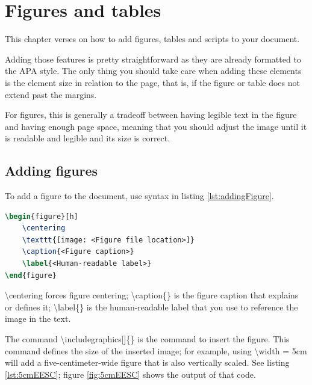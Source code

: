 \chapter{Figures and tables}

	This chapter verses on how to add figures, tables and scripts to your document.

	Adding those features is pretty straightforward as they are already formatted to the APA style. The only thing you should take care when adding these elements is the element size in relation to the page, that is, if the figure or table does not extend past the margins.

	For figures, this is generally a tradeoff between having legible text in the figure and having enough page space, meaning that you should adjust the image until it is readable and legible and its size is correct.

	\section{Adding figures}

	To add a figure to the document, use syntax in listing \ref{lst:addingFigure}.

\begin{lstlisting}[caption = {Basic code for adding a figure.}, label = {lst:addingFigure}, style = prettyListing, language = tex]
\begin{figure}[h]
	\centering
	\texttt{[image: <Figure file location>]}
	\caption{<Figure caption>}
	\label{<Human-readable label>}
\end{figure}
\end{lstlisting}

	{\ttfamily\small \textbackslash centering } forces figure centering; {\ttfamily\small \textbackslash caption\{\} } is the figure caption that explains or defines it; {\ttfamily\small \textbackslash label\{\} } is the human-readable label that you use to reference the image in the text.

	The command {\ttfamily\small \textbackslash includegraphics[]\{\} } is the command to insert the figure. This command defines the size of the inserted image; for example, using {\ttfamily\small \textbackslash width = 5cm} will add a five-centimeter-wide figure that is also vertically scaled. See listing \ref{lst:5cmEESC}; figure \ref{fig:5cmEESC} shows the output of that code.

